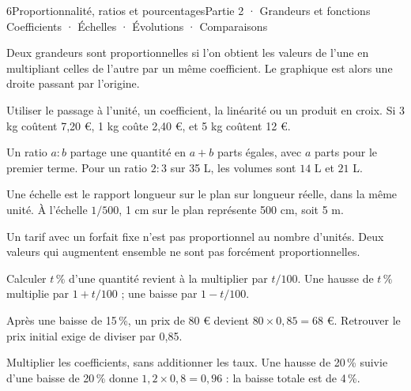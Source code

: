 \begin{ouverture}[courbe]{6}{Proportionnalité, ratios et pourcentages}{Partie 2 · Grandeurs et fonctions}
{Coefficients · Échelles · Évolutions · Comparaisons}
\end{ouverture}
\pagestyle{otMain}\essentiel\fontsize{11}{15}\selectfont
{}
\begin{definition}Deux grandeurs sont proportionnelles si l’on obtient les valeurs de l’une en multipliant celles de l’autre par un même coefficient. Le graphique est alors une droite passant par l’origine.\end{definition}
\begin{savoirfaire}Utiliser le passage à l’unité, un coefficient, la linéarité ou un produit en croix. Si 3 kg coûtent 7,20 €, 1 kg coûte 2,40 €, et 5 kg coûtent 12 €.\end{savoirfaire}
\begin{definition}Un ratio $a:b$ partage une quantité en $a+b$ parts égales, avec $a$ parts pour le premier terme. Pour un ratio $2:3$ sur 35 L, les volumes sont $14$ L et $21$ L.\end{definition}
\begin{definition}Une échelle est le rapport longueur sur le plan sur longueur réelle, dans la même unité. À l’échelle $1/500$, 1 cm sur le plan représente 500 cm, soit 5 m.\end{definition}
\begin{attention}Un tarif avec un forfait fixe n’est pas proportionnel au nombre d’unités. Deux valeurs qui augmentent ensemble ne sont pas forcément proportionnelles.\end{attention}
\clearpage
{}
\begin{propriete}Calculer $t\,\%$ d’une quantité revient à la multiplier par $t/100$. Une hausse de $t\,\%$ multiplie par $1+t/100$ ; une baisse par $1-t/100$.\end{propriete}
\begin{exemple}Après une baisse de 15\,\%, un prix de 80 € devient $80\times0{,}85=68$ €. Retrouver le prix initial exige de diviser par 0,85.\end{exemple}
\begin{savoirfaire}Multiplier les coefficients, sans additionner les taux. Une hausse de 20\,\% suivie d’une baisse de 20\,\% donne $1{,}2\times0{,}8=0{,}96$ : la baisse totale est de 4\,\%.\end{savoirfaire}
